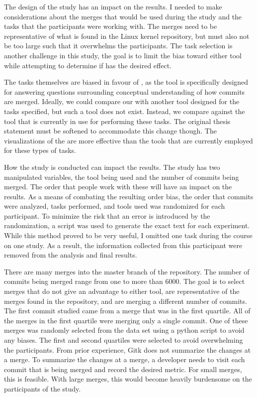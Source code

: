 The design of the study has an impact on the results.
I needed to make considerations about the merges that would be used
during the study and the tasks that the participants were working with.
The merges need to be representative of what is found in the Linux
kernel repository, but must also not be too large such that it
overwhelms the participants.
The task selection is another challenge in this study, the goal is to
limit the bias toward either tool while attempting to determine if
\tool{} has the desired effect.

The tasks themselves are biased in favour of \tool{}, as the tool is
specifically designed for answering questions surrounding conceptual
understanding of how commits are merged.
Ideally, we could compare our \tool{} with another tool designed for the
tasks specified, but such a tool does not exist.
Instead, we compare against the tool that is currently in use for
performing these tasks.
The original thesis statement must be softened to accommodate this
change though.
The visualizations of the \mt{} are more effective than the tools that
are currently employed for these types of tasks.

How the study is conducted can impact the results.
The study has two manipulated variables, the tool being used and the
number of commits being merged.
The order that people work with these will have an impact on the
results.
As a means of combating the resulting order bias, the order that commits
were analyzed, tasks performed, and tools used was randomized for each
participant.
To minimize the risk that an error is introduced by the randomization, a
script was used to generate the exact text for each experiment.
While this method proved to be very useful,
I omitted one task during the course on one study.
As a result, the information collected from this participant were
removed from the analysis and final results.

There are many merges into the master branch of the repository.
The number of commits being merged range from one to more than 6000.
The goal is to select merges that do not give an advantage to either
tool, are representative of the merges found in the repository, and are
merging a different number of commits.
The first commit studied came from a merge that was in the first
quartile.
All of the merges in the first quartile were merging only a single
commit.
One of these merges was randomly selected from the data set using a
python script to avoid any biases.
The first and second quartiles were selected to avoid overwhelming the
participants.
From prior experience, Gitk does not summarize the changes at a merge.
To summarize the changes at a merge, a developer needs to visit each
commit that is being merged and record the desired metric.
For small merges, this is feasible.
With large merges, this would become heavily burdensome on the
participants of the study.

